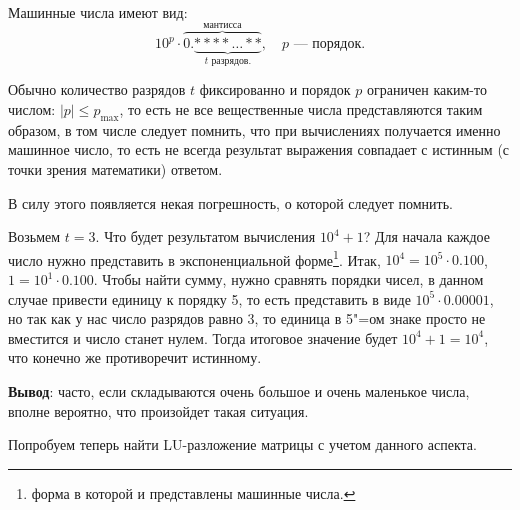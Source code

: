 Машинные числа имеют вид:
\[
    10 ^ {p}  \cdot \overbrace{0.\underbrace{****\ldots **}_{t \text{ разрядов.}}}^{\text{мантисса}}, \quad p\text{~--- порядок.}
\]

Обычно количество разрядов $t$ фиксированно и порядок $p$ ограничен каким-то числом: $|p|\leqslant p_{\max}$, то есть не все вещественные числа
представляются таким образом, в том числе следует помнить, что при вычислениях получается именно машинное число, то есть не всегда
результат выражения совпадает с истинным (с точки зрения математики) ответом.

В силу этого появляется некая погрешность, о которой следует помнить.
\begin{exercise}
    Возьмем $t=3$. Что будет результатом вычисления $10^4+1$? Для начала каждое число нужно представить в экспоненциальной
    форме\footnote{форма в которой и представлены машинные числа.}. Итак, $10^4=10^5\cdot 0.100$, $1 = 10^1\cdot 0.100$.
    Чтобы найти сумму, нужно сравнять порядки чисел, в данном случае привести единицу к порядку 5, то есть представить в виде
    $10^5\cdot 0.00001$, но так как у нас число разрядов равно 3, то единица в 5"=ом знаке просто не вместится и число станет нулем.
    Тогда итоговое значение будет $10^4+1=10^4$, что конечно же противоречит истинному.

    \textbf{Вывод}: часто, если складываются очень большое и очень маленькое числа, вполне вероятно, что произойдет такая ситуация.
\end{exercise}

Попробуем теперь найти LU-разложение матрицы с учетом данного аспекта.

